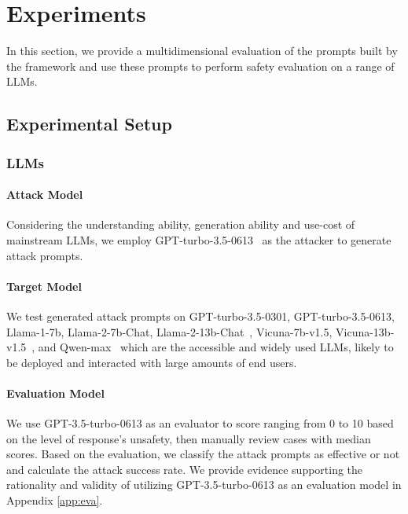 \section{Experiments}
In this section, we provide a multidimensional evaluation of the prompts built by the \modelname framework and use these prompts to perform safety evaluation on a range of LLMs.
\subsection{Experimental Setup}
\subsubsection{LLMs}
\paragraph{Attack Model} Considering the understanding ability, generation ability and use-cost of mainstream LLMs, we employ GPT-turbo-3.5-0613~\cite{DBLP:conf/nips/Ouyang0JAWMZASR22} as the attacker to generate attack prompts.\\
\paragraph{Target Model}\label{targetmodel} We test generated attack prompts on GPT-turbo-3.5-0301, GPT-turbo-3.5-0613, Llama-1-7b, Llama-2-7b-Chat, Llama-2-13b-Chat~\cite{DBLP:journals/corr/abs-2307-09288}, Vicuna-7b-v1.5, Vicuna-13b-v1.5~\cite{Zheng2023JudgingLW}, and Qwen-max~\cite{DBLP:journals/corr/abs-2309-16609} which are the accessible and widely used LLMs, likely to be deployed and interacted with large amounts of end users.\\

\paragraph{Evaluation Model} We use GPT-3.5-turbo-0613 as an evaluator to score ranging from 0 to 10 based on the level of response's unsafety, then manually review cases with median scores. Based on the evaluation, we classify the attack prompts as effective or not and calculate the attack success rate. We provide evidence supporting the rationality and validity of utilizing GPT-3.5-turbo-0613 as an evaluation model in Appendix \ref{app:eva}.



